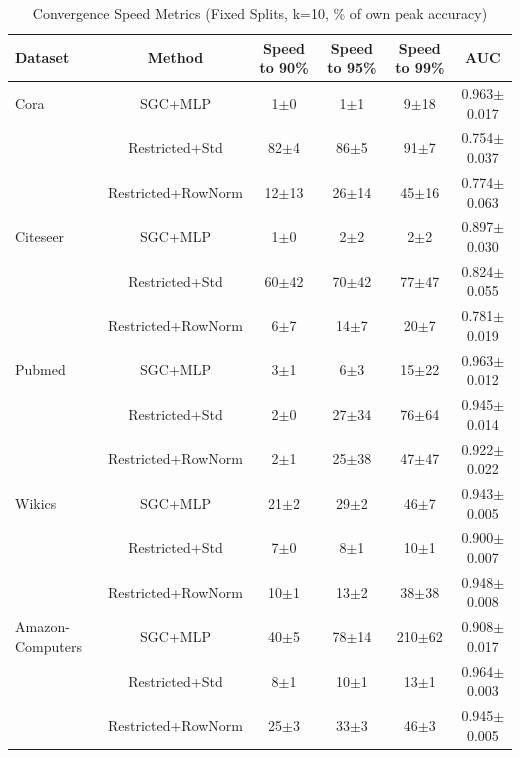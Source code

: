\begin{table}[t]
\centering
\caption{Convergence Speed Metrics (Fixed Splits, k=10, \% of own peak accuracy)}
\label{tab:convergence_speed_fixed}
\begin{tabular}{lccccc}
\toprule
\textbf{Dataset} & \textbf{Method} & \textbf{Speed to 90\%} & \textbf{Speed to 95\%} & \textbf{Speed to 99\%} & \textbf{AUC} \\
\midrule
Cora                 & SGC+MLP                   & 1$\pm$0 & 1$\pm$1 & 9$\pm$18 & 0.963$\pm$0.017 \\
                     & Restricted+Std            & 82$\pm$4 & 86$\pm$5 & 91$\pm$7 & 0.754$\pm$0.037 \\
                     & Restricted+RowNorm        & 12$\pm$13 & 26$\pm$14 & 45$\pm$16 & 0.774$\pm$0.063 \\
\midrule
Citeseer             & SGC+MLP                   & 1$\pm$0 & 2$\pm$2 & 2$\pm$2 & 0.897$\pm$0.030 \\
                     & Restricted+Std            & 60$\pm$42 & 70$\pm$42 & 77$\pm$47 & 0.824$\pm$0.055 \\
                     & Restricted+RowNorm        & 6$\pm$7 & 14$\pm$7 & 20$\pm$7 & 0.781$\pm$0.019 \\
\midrule
Pubmed               & SGC+MLP                   & 3$\pm$1 & 6$\pm$3 & 15$\pm$22 & 0.963$\pm$0.012 \\
                     & Restricted+Std            & 2$\pm$0 & 27$\pm$34 & 76$\pm$64 & 0.945$\pm$0.014 \\
                     & Restricted+RowNorm        & 2$\pm$1 & 25$\pm$38 & 47$\pm$47 & 0.922$\pm$0.022 \\
\midrule
Wikics               & SGC+MLP                   & 21$\pm$2 & 29$\pm$2 & 46$\pm$7 & 0.943$\pm$0.005 \\
                     & Restricted+Std            & 7$\pm$0 & 8$\pm$1 & 10$\pm$1 & 0.900$\pm$0.007 \\
                     & Restricted+RowNorm        & 10$\pm$1 & 13$\pm$2 & 38$\pm$38 & 0.948$\pm$0.008 \\
\midrule
Amazon-Computers     & SGC+MLP                   & 40$\pm$5 & 78$\pm$14 & 210$\pm$62 & 0.908$\pm$0.017 \\
                     & Restricted+Std            & 8$\pm$1 & 10$\pm$1 & 13$\pm$1 & 0.964$\pm$0.003 \\
                     & Restricted+RowNorm        & 25$\pm$3 & 33$\pm$3 & 46$\pm$3 & 0.945$\pm$0.005 \\

\end{tabular}
\end{table}
